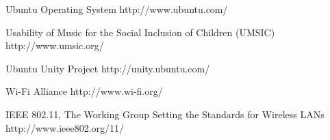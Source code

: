 \begin{thebibliography}{9}
		{Ubuntu Operating System}
		{http://www.ubuntu.com/}

		{Usability of Music for the Social Inclusion of Children (UMSIC)}
		{http://www.umsic.org/}
		
		{Ubuntu Unity Project}
		{http://unity.ubuntu.com/}

		{Wi-Fi Alliance}
		{http://www.wi-fi.org/}

		{IEEE 802.11, The Working Group Setting the Standards for Wireless LANs}
		{http://www.ieee802.org/11/}

\end{thebibliography}